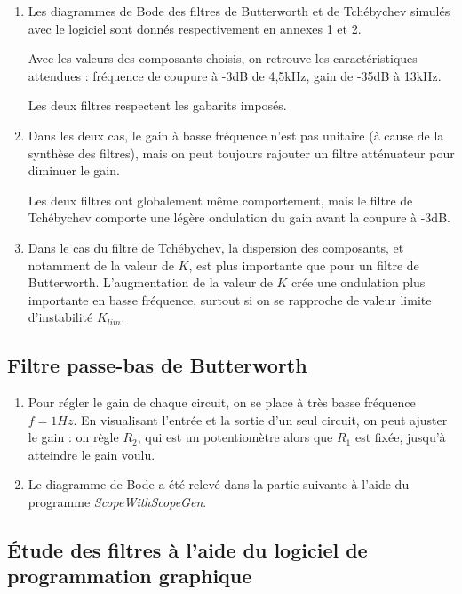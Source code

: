 \documentclass[../../Cours_M1.tex]{subfiles}
\begin{document}
\begin{enumerate}

\item Les diagrammes de Bode des filtres de Butterworth et de Tchébychev simulés avec le logiciel sont donnés respectivement en annexes 1 et 2.

Avec les valeurs des composants choisis, on retrouve les caractéristiques attendues : fréquence de coupure à -3dB de 4,5kHz, gain de -35dB à 13kHz.

Les deux filtres respectent les gabarits imposés.

\item Dans les deux cas, le gain à basse fréquence n'est pas unitaire (à cause de la synthèse des filtres), mais on peut toujours rajouter un filtre atténuateur pour diminuer le gain.

Les deux filtres ont globalement même comportement, mais le filtre de Tchébychev comporte une légère ondulation du gain avant la coupure à -3dB.

\item Dans le cas du filtre de Tchébychev,  la dispersion des composants, et notamment de la valeur de $K$, est plus importante que pour un filtre de Butterworth. L'augmentation de la valeur de $K$ crée une ondulation plus importante en basse fréquence, surtout si on se rapproche de valeur limite d'instabilité $K_{lim}$.
\end{enumerate}

\subsection{Filtre passe-bas de Butterworth}

\begin{enumerate}
\item Pour régler le gain de chaque circuit, on se place à très basse fréquence $f=1Hz$. En visualisant l'entrée et la sortie d'un seul circuit, on peut ajuster le gain : on règle $R_2$, qui est un potentiomètre alors que $R_1$ est fixée, jusqu'à atteindre le gain voulu.
\item Le diagramme de Bode a été relevé dans la partie suivante à l'aide du programme \textit{ScopeWithScopeGen}.
\end{enumerate}

\subsection{Étude des filtres à l'aide du logiciel de programmation graphique}
\end{document}
